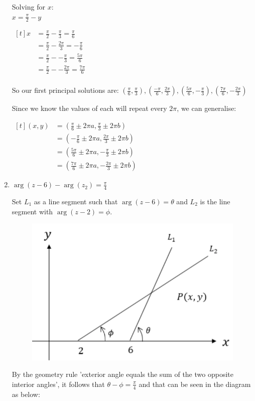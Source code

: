 \documentclass[../main.tex]{subfiles}
\begin{document}
\begin{enumerate}[itemsep=1cm]
    Solving for \(x\):\\
    \(x=\frac{\pi}{2}-y\)

    $
    \!
    \begin{aligned}[t]
        x
        &=\frac{\pi}{2}-\frac{\pi}{3}=\frac{\pi}{6}\\
        &=\frac{\pi}{2}-\frac{2\pi}{3}=-\frac{\pi}{6}\\
        &=\frac{\pi}{2}--\frac{\pi}{3}=\frac{5\pi}{6}\\
        &=\frac{\pi}{2}--\frac{2\pi}{3}=\frac{7\pi}{6}\\
    \end{aligned}
    $

    So our first principal solutions are: \((\frac{\pi}{6}, \frac{\pi}{3}), (\frac{-\pi}{6}, \frac{2\pi}{3}), (\frac{5\pi}{6}, -\frac{\pi}{3}), (\frac{7\pi}{6}, -\frac{2\pi}{3})\)
    
    Since we know the values of each will repeat every \(2\pi\), we can generalise:

    $
    \!
    \begin{aligned}[t]
        (x,y)
        &=(\frac{\pi}{6}\pm 2\pi a, \frac{\pi}{3}\pm 2\pi b)\\
        &=(-\frac{\pi}{6}\pm 2\pi a, \frac{2\pi}{3}\pm 2\pi b)\\
        &=(\frac{5\pi}{6}\pm 2\pi a, -\frac{\pi}{3}\pm 2\pi b)\\
        &=(\frac{7\pi}{6}\pm 2\pi a, -\frac{2\pi}{3}\pm 2\pi b)
    \end{aligned}
    $

    \item 
    \(\arg{(z-6)}-\arg{(z_2)}=\frac{\pi}{4}\)

    Set $L_1$ as a line segment such that $\arg{(z-6)}=\theta$ and $L_2$ is the line segment with $\arg{(z-2)=\phi}$.

    \begin{figure}[h]
        \centering
        \includegraphics[width=0.25\linewidth]{images/t2w8q3a1.png}
    \end{figure}

    By the geometry rule 'exterior angle equals the sum of the two opposite interior angles', it follows that $\theta - \phi = \frac{\pi}{4}$ and that can be seen in the diagram as below:


\end{enumerate}
\end{document}
